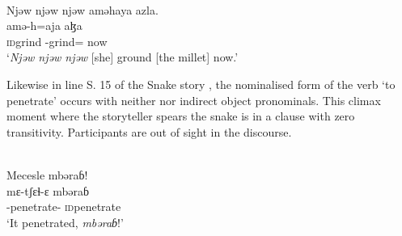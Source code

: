 \ea \label{ex:9:67}
\\
Njəw  njəw  njəw  aməhaya  azla.\\
    amə-h=aja        aɮa\\
      \textsc{id}grind  {\DEP}-grind={\PLU} now\\
\glt  ‘\textit{Njəw  njəw  njəw} [she] ground [the millet] now.’  
\z

Likewise in line S. 15 of the Snake story , the nominalised form of the verb ‘to penetrate’ occurs with neither \DO nor indirect object pronominals. This climax moment where the storyteller spears the snake is in a clause with zero transitivity. Participants are out of sight in the discourse. 

\ea \label{ex:9:68}
\\
Mecesle  mbəraɓ!\\
\gll  mɛ-tʃɛɬ-ɛ  mbəraɓ\\
      {\NOM}{}-penetrate{}-{\CL}      \textsc{id}penetrate \\
\glt  ‘It penetrated, \textit{mbəraɓ}!’
\z
{}
